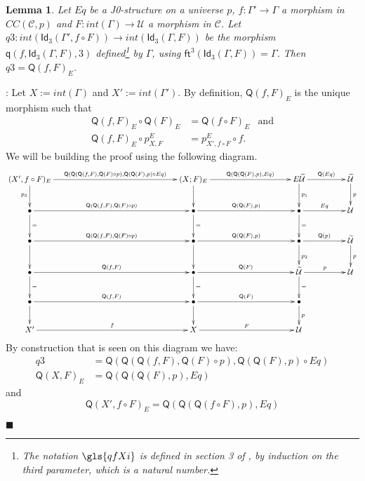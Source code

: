 \documentclass[12pt]{article}
\numberwithin{equation}{section}
\newenvironment{myproof}{{\bf Proof}:}{$\blacksquare$ \vskip 5mm }
\newtheorem{lemma}[proposition]{Lemma}
\newcommand{\sr}{\rightarrow}
\newcommand{\wt}{\widetilde}
\newcommand{\BB}{{\bullet}}
\newcommand{\toCC}{CC} %
\newcommand{\C}{{\mathcal C}}  %
\newcommand{\ft}{\mathsf{ft}}
\newcommand{\q}{\mathsf{q}}
\newcommand{\Idx}{\mathsf{Id}_3} %
\newcommand{\U}{\mathcal{U}}
\newcommand{\Q}{\mathsf{Q}}
\begin{document}
\begin{lemma}
\label{2015.04.04.l4} Let $Eq$ be a J0-structure on a universe $p$,
$f:\Gamma'\sr \Gamma$ a morphism in $\toCC({\C},p)$ and $F:int(\Gamma)\sr \U$ a morphism in $\C$.
Let $q3:int(\Idx(\Gamma',f\circ F))\sr int(\Idx(\Gamma,F))$ be the morphism $\q(f,\Idx(\Gamma,F),3)$ defined\footnote{The notation $\gls{qfXi}$
is defined in section 3 of \cite{Csubsystems}, by induction on the third parameter, which is a natural number.} by
$\Gamma$, using $\ft^3(\Idx(\Gamma,F))=\Gamma$.  Then $q3=\Q(f,F)_{E}$.
\end{lemma}
%
\begin{myproof}
Let $X:=int(\Gamma)$ and $X':=int(\Gamma')$. By definition, $\Q(f,F)_{E}$ is the
unique morphism such that
%
\begin{align*}
  \Q(f,F)_{E}\circ \Q(F)_{E}&=\Q(f\circ F)_{E} & \text{and} \\
  \Q(f,F)_{E}\circ p^{E}_{X,F}&=p^{E}_{X',f\circ F}\circ f.
\end{align*}
%
We will be building the proof using the following diagram.
%
$$
\begin{xy}
          \xymatrix@C=4pc{ (X',f\circ F)_{E} \ar[rrr]^-{\Q(\Q(\Q(f,F),\Q(F)\circ
              p),\Q(\Q(F),p)\circ Eq)} \ar[d]_{p_3} &&& (X;F)_{E}
            \ar[rr]^-{\Q(\Q(\Q(F),p),Eq)} \ar[d] && E\wt{\U} \ar[r]^-{\Q(Eq)}
            \ar[d]^{p_1} & \wt{\U} \ar[d]^{p}\\ \BB
            \ar[rrr]^-{\Q(\Q(f,F),\Q(F)\circ p)} \ar[d]^{=} &&& \BB
            \ar[rr]^-{\Q(\Q(F),p)} \ar[d]^{=} && \BB \ar[r]^-{Eq} \ar[d]^{=}&
            \U\\ \BB \ar[rrr]^-{\Q(\Q(f,F),\Q(F)\circ p)} \ar[d] &&& \BB
            \ar[rr]^-{\Q(\Q(F),p)} \ar[d] && \BB \ar[r]^-{\Q(p)} \ar[d]^{p_2}&
            \wt{\U} \ar[d]^{p}\\ \BB \ar[rrr]^-{\Q(f,F)} \ar[d]^{=}&&& \BB
            \ar[rr]^-{\Q(F)} \ar[d]^{=} && \wt{\U} \ar[r]^-{p} \ar[d]^{=} & \U
            \\ \BB \ar[rrr]^-{\Q(f,F)} \ar[d] &&& \BB \ar[rr]^-{\Q(F)} \ar[d] &&
            \BB \ar[d]^{p}\\ X' \ar[rrr]^-{f} &&& X \ar[rr]^-{F} && \U }
\end{xy}
$$
%
By construction that is seen on this diagram we have:
%
\begin{align*}
  q3&=\Q(\Q(\Q(f,F),\Q(F)\circ p),\Q(\Q(F),p)\circ Eq) \\
  \Q(X,F)_{E}&=\Q(\Q(\Q(F),p),Eq)
\end{align*}
%
and
%
$$\Q(X', f\circ F)_{E}=\Q(\Q(\Q(f\circ F),p),Eq)$$

\end{myproof}
\end{document}
